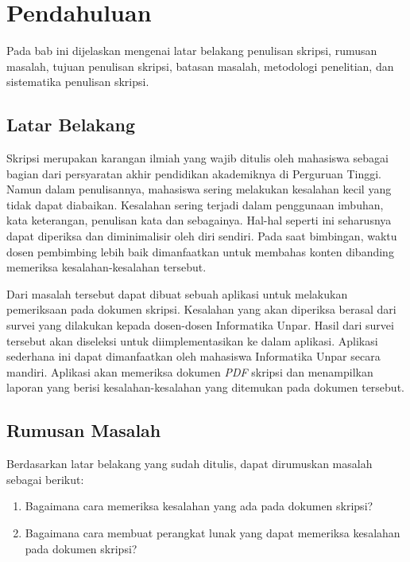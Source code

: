\chapter{Pendahuluan}
\label{chap:intro}
   
Pada bab ini dijelaskan mengenai latar belakang penulisan skripsi, rumusan masalah, tujuan penulisan skripsi, batasan masalah, metodologi penelitian, dan sistematika penulisan skripsi.

\section{Latar Belakang}
\label{sec:label}

Skripsi merupakan karangan ilmiah yang wajib ditulis oleh mahasiswa sebagai bagian dari persyaratan akhir pendidikan akademiknya di Perguruan Tinggi. Namun dalam penulisannya, mahasiswa sering melakukan kesalahan kecil yang tidak dapat diabaikan. Kesalahan sering terjadi dalam penggunaan imbuhan, kata keterangan, penulisan kata dan sebagainya. Hal-hal seperti ini seharusnya dapat diperiksa dan diminimalisir oleh diri sendiri. Pada saat bimbingan, waktu dosen pembimbing lebih baik dimanfaatkan untuk membahas konten dibanding memeriksa kesalahan-kesalahan tersebut. 

Dari masalah tersebut dapat dibuat sebuah aplikasi untuk melakukan pemeriksaan pada dokumen skripsi. Kesalahan yang akan diperiksa berasal dari survei yang dilakukan kepada dosen-dosen Informatika Unpar. Hasil dari survei tersebut akan diseleksi untuk diimplementasikan ke dalam aplikasi. Aplikasi sederhana ini dapat dimanfaatkan oleh mahasiswa Informatika Unpar secara mandiri. Aplikasi akan memeriksa dokumen \textit{PDF} skripsi dan menampilkan laporan yang berisi kesalahan-kesalahan yang ditemukan pada dokumen tersebut. 

\section{Rumusan Masalah}
\label{sec:rumusan}
Berdasarkan latar belakang yang sudah ditulis, dapat dirumuskan masalah sebagai berikut:
\begin{enumerate}
	\item Bagaimana cara memeriksa kesalahan yang ada pada dokumen skripsi?
	\item Bagaimana cara membuat perangkat lunak yang dapat memeriksa kesalahan pada dokumen skripsi?
\end{enumerate}

